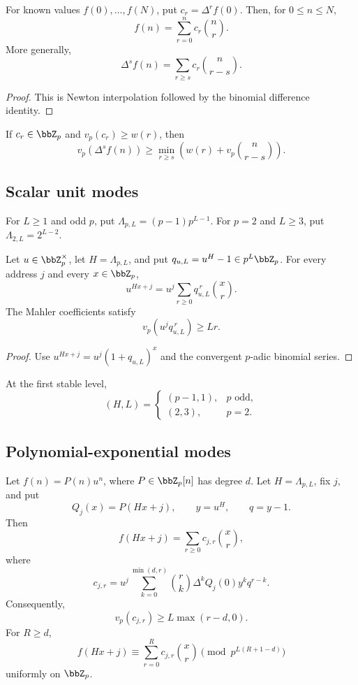 \begin{theorem}
For known values $f(0),\ldots,f(N)$, put $c_r=\Delta^rf(0)$. Then, for $0\leq n\leq N$,
\[
 \boxed{f(n)=\sum_{r=0}^{n}c_r\binom nr.}
\]
More generally,
\[
 \boxed{\Delta^sf(n)=\sum_{r\geq s}c_r\binom n{r-s}.}
\]
\end{theorem}

\begin{proof}
This is Newton interpolation followed by the binomial difference identity.
\end{proof}

\begin{corollary}
If $c_r\in\bbZ_p$ and $v_p(c_r)\geq w(r)$, then
\[
 \boxed{v_p(\Delta^sf(n))\geq\min_{r\geq s}\left(w(r)+v_p\binom n{r-s}\right).}
\]
\end{corollary}

\subsection{Scalar unit modes}
For $L\geq1$ and odd $p$, put $\Lambda_{p,L}=(p-1)p^{L-1}$. For $p=2$ and $L\geq3$, put $\Lambda_{2,L}=2^{L-2}$.

\begin{theorem}
Let $u\in\bbZ_p^\times$, let $H=\Lambda_{p,L}$, and put $q_{u,L}=u^H-1\in p^L\bbZ_p$. For every address $j$ and every $x\in\bbZ_p$,
\[
 \boxed{u^{Hx+j}=u^j\sum_{r\geq0}q_{u,L}^{\,r}\binom xr.}
\]
The Mahler coefficients satisfy
\[
 \boxed{v_p\left(u^jq_{u,L}^{\,r}\right)\geq Lr.}
\]
\end{theorem}

\begin{proof}
Use $u^{Hx+j}=u^j(1+q_{u,L})^x$ and the convergent $p$-adic binomial series.
\end{proof}

At the first stable level,
\[
 (H,L)=\begin{cases}(p-1,1),&p\text{ odd},\\(2,3),&p=2.\end{cases}
\]

\subsection{Polynomial-exponential modes}
\begin{theorem}
Let $f(n)=P(n)u^n$, where $P\in\bbZ_p[n]$ has degree $d$. Let $H=\Lambda_{p,L}$, fix $j$, and put
\[
 Q_j(x)=P(Hx+j),\qquad y=u^H,\qquad q=y-1.
\]
Then
\[
 f(Hx+j)=\sum_{r\geq0}c_{j,r}\binom xr,
\]
where
\[
 \boxed{c_{j,r}=u^j\sum_{k=0}^{\min(d,r)}\binom rk\Delta^kQ_j(0)y^kq^{r-k}.}
\]
Consequently,
\[
 \boxed{v_p(c_{j,r})\geq L\max(r-d,0).}
\]
For $R\geq d$,
\[
 \boxed{f(Hx+j)\equiv\sum_{r=0}^{R}c_{j,r}\binom xr\pmod{p^{L(R+1-d)}}}
\]
uniformly on $\bbZ_p$.
\end{theorem}


